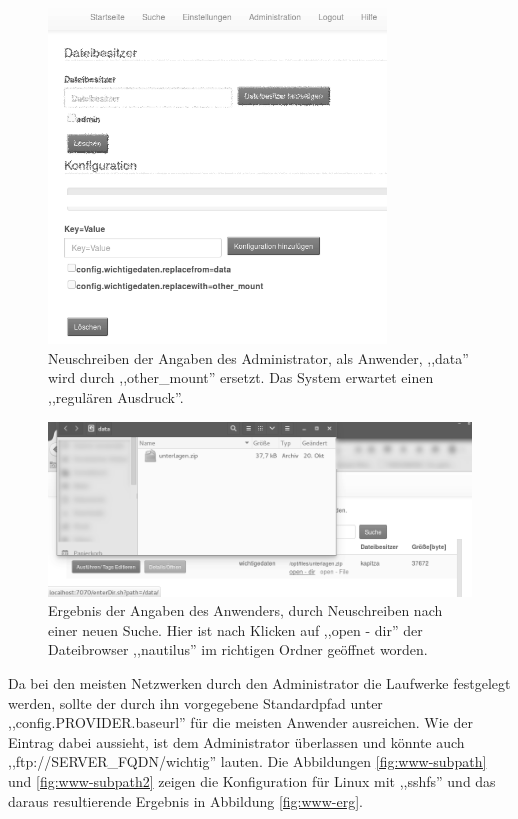 \documentclass[oneside, ngerman, toc=bibliography,bibliography=totoc,listof=entryprefix, open=right,numbers=noenddot,fontsize=12pt]{scrbook}
\begin{document}
\begin{figure}[htbp] 
    \centering
    \includegraphics[width=0.8\textwidth]{Masterarbeit_Bilder/user_rewrite_other_mount.png}
    \caption{Neuschreiben der Angaben des Administrator, als Anwender, ,,data'' wird durch ,,other\_mount'' ersetzt. Das System erwartet einen ,,regulären Ausdruck''. }
    \label{fig:www-subpath3}
\end{figure}  

\begin{figure}[htbp] 
    \centering
    \includegraphics[width=\textwidth]{Masterarbeit_Bilder/open_mount_dir.png}
    \caption{Ergebnis der Angaben des Anwenders, durch Neuschreiben nach einer neuen Suche. Hier ist nach Klicken auf ,,open - dir'' der Dateibrowser ,,nautilus'' im richtigen Ordner geöffnet worden.}
    \label{fig:www-erg2}
\end{figure}  




Da bei den meisten Netzwerken durch den Administrator die Laufwerke festgelegt werden, sollte der durch ihn vorgegebene Standardpfad unter ,,config.{PROVIDER}.baseurl'' für die meisten Anwender ausreichen. Wie der Eintrag dabei aussieht, ist dem Administrator überlassen und könnte auch ,,ftp://SERVER\_FQDN/wichtig'' lauten.
Die Abbildungen \ref{fig:www-subpath} und \ref{fig:www-subpath2} zeigen die Konfiguration für Linux mit ,,sshfs'' und das daraus resultierende Ergebnis in Abbildung \ref{fig:www-erg}.
\end{document}
